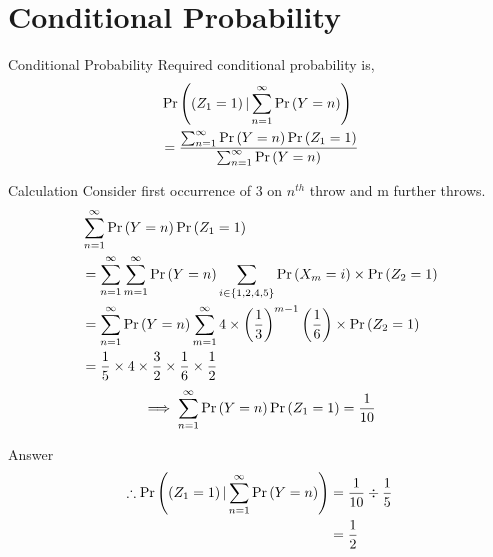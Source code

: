 \documentclass{beamer}
\begin{document}
\section{Conditional Probability}
\begin{frame}{Conditional Probability}
    Required conditional probability is,
    \begin{align}
        &\Pr\left(\left(Z_1=1\right) | \sum_{n=1}^\infty \Pr\left(Y=n\right)\right) \\
        &=\frac{ \sum_{n=1}^\infty \Pr\left(Y=n\right) \Pr\left(Z_1 = 1\right)} {\sum_{n=1}^\infty \Pr\left(Y=n\right)}
    \end{align}
\end{frame}
\begin{frame}{Calculation}
    Consider first occurrence of 3 on $n^{th}$ throw and m further throws.
    \begin{align}
        &\sum_{n=1}^\infty \Pr\left(Y=n\right) \Pr\left(Z_1 = 1\right) \\
        &=\sum_{n=1}^\infty \sum_{m=1}^\infty \Pr\left(Y=n\right) 
          \sum_{i \in \left\{1,2,4,5\right\}}\Pr\left(X_m = i\right) \times \Pr\left(Z_2 = 1\right) \\
        &=\sum_{n=1}^\infty \Pr\left(Y=n\right) \sum_{m=1}^\infty 
        4 \times \left(\frac{1}{3}\right)^{m-1} \left(\frac{1}{6}\right) \times \Pr\left(Z_2 = 1\right) \\
        &= \frac{1}{5} \times 4 \times \frac{3}{2} \times \frac{1}{6} \times \frac{1}{2}
    \end{align}
    \begin{align}
        \implies \sum_{n=1}^\infty \Pr\left(Y=n\right) \Pr\left(Z_1 = 1\right) = \frac{1}{10}
    \end{align}
\end{frame}
\begin{frame}{Answer}
    \begin{align}
    \therefore \Pr\left(\left(Z_1=1\right) | \sum_{n=1}^\infty \Pr\left(Y=n\right)\right)  &= \frac{1}{10} \div \frac{1}{5} \\
    &= \frac{1}{2}
    \end{align}
\end{frame}
\end{document}
